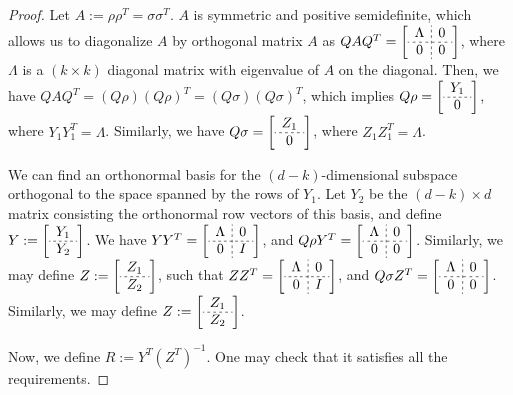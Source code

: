 \documentclass{article}
\begin{document}
\begin{proof}
Let $A:=\rho\rho^T=\sigma\sigma^T$. $A$ is symmetric and positive semidefinite, which allows us to diagonalize $A$ by orthogonal matrix $A$ as 
$QAQ^T=\left[
    \begin{array}{c;{2pt/2pt}c}
        \Lambda & 0 \\ \hdashline[2pt/2pt]
        0 & 0 
    \end{array}
\right]
$,
where $\Lambda$ is a $(k\times k)$ diagonal matrix with eigenvalue of $A$ on the diagonal. Then, we have $QAQ^T=(Q\rho)(Q\rho)^T=(Q\sigma)(Q\sigma)^T$, which implies 
$Q\rho=\left[
    \begin{array}{c}
        Y_1 \\ \hdashline[2pt/2pt]
        0
    \end{array}
\right]
$,
where $Y_1Y_1^T=\Lambda$. Similarly, we have 
$Q\sigma=\left[
    \begin{array}{c}
        Z_1 \\ \hdashline[2pt/2pt]
        0
    \end{array}
\right]
$,
where $Z_1Z_1^T=\Lambda$. 

We can find an orthonormal basis for the $(d-k)$-dimensional subspace orthogonal to the space spanned by the rows of $Y_1$. Let $Y_2$ be the $(d-k)\times d$ matrix consisting the orthonormal row vectors of this basis, and define 
$Y:=\left[
    \begin{array}{c}
        Y_1 \\ \hdashline[2pt/2pt]
        Y_2
    \end{array}
\right]
$. We have 
$YY^T=\left[
    \begin{array}{c;{2pt/2pt}c}
        \Lambda & 0 \\ \hdashline[2pt/2pt]
        0 & I 
    \end{array}
\right]
$, and 
$Q\rho Y^T=\left[
    \begin{array}{c;{2pt/2pt}c}
        \Lambda & 0 \\ \hdashline[2pt/2pt]
        0 & 0 
    \end{array}
\right]
$. Similarly, we may define 
$Z:=\left[
    \begin{array}{c}
        Z_1 \\ \hdashline[2pt/2pt]
        Z_2
    \end{array}
\right]
$, such that 
$ZZ^T=\left[
    \begin{array}{c;{2pt/2pt}c}
        \Lambda & 0 \\ \hdashline[2pt/2pt]
        0 & I 
    \end{array}
\right]
$, and 
$Q\sigma Z^T=\left[
    \begin{array}{c;{2pt/2pt}c}
        \Lambda & 0 \\ \hdashline[2pt/2pt]
        0 & 0 
    \end{array}
\right]
$. Similarly, we may define 
$Z:=\left[
    \begin{array}{c}
        Z_1 \\ \hdashline[2pt/2pt]
        Z_2
    \end{array}
\right]
$. 

Now, we define $R:=Y^T(Z^T)^{-1}$. One may check that it satisfies all the requirements. 
    
    
\end{proof}
\end{document}

